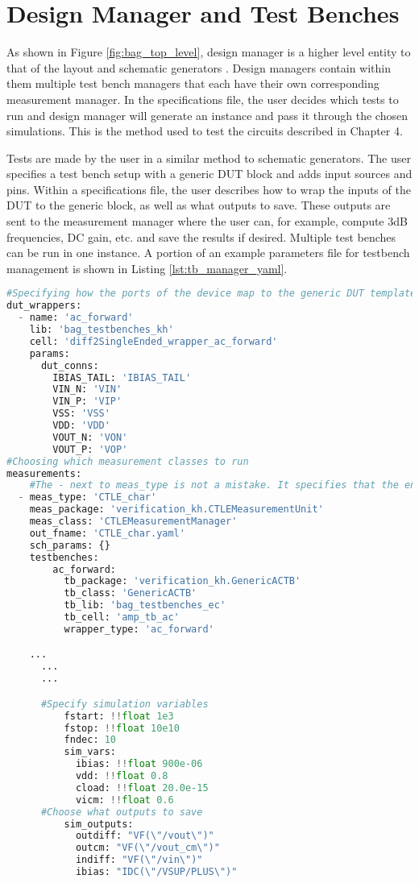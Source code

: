 \section{Design Manager and Test Benches}
As shown in Figure \ref{fig:bag_top_level}, design manager is a higher level entity to that of the layout and schematic generators \cite{chang_bag2:_2018}. Design managers contain within them multiple test bench managers that each have their own corresponding measurement manager. In the specifications file, the user decides which tests to run and design manager will generate an instance and pass it through the chosen simulations. This is the method used to test the circuits described in Chapter 4. 

Tests are made by the user in a similar method to schematic generators. The user specifies a test bench setup with a generic DUT block and adds input sources and pins. Within a specifications file, the user describes how to wrap the inputs of the DUT to the generic block, as well as what outputs to save. These outputs are sent to the measurement manager where the user can, for example, compute 3dB frequencies, DC gain, etc. and save the results if desired. Multiple test benches can be run in one instance. A portion of an example parameters file for testbench management is shown in Listing \ref{lst:tb_manager_yaml}.
\begin{lstlisting}[language=Python, caption=Test bench parameters, label={lst:tb_manager_yaml}, float]
#Specifying how the ports of the device map to the generic DUT template
dut_wrappers:
  - name: 'ac_forward'
    lib: 'bag_testbenches_kh'
    cell: 'diff2SingleEnded_wrapper_ac_forward'
    params:
      dut_conns:
        IBIAS_TAIL: 'IBIAS_TAIL'
        VIN_N: 'VIN'
        VIN_P: 'VIP'
        VSS: 'VSS'
        VDD: 'VDD'
        VOUT_N: 'VON'
        VOUT_P: 'VOP'
#Choosing which measurement classes to run
measurements:
    #The - next to meas_type is not a mistake. It specifies that the entire contents of measurements is a list.
  - meas_type: 'CTLE_char'
    meas_package: 'verification_kh.CTLEMeasurementUnit'
    meas_class: 'CTLEMeasurementManager'
    out_fname: 'CTLE_char.yaml'
    sch_params: {}
    testbenches:
        ac_forward:
          tb_package: 'verification_kh.GenericACTB'
          tb_class: 'GenericACTB'
          tb_lib: 'bag_testbenches_ec'
          tb_cell: 'amp_tb_ac'
          wrapper_type: 'ac_forward'

    ...
	  ...
	  ...

	  #Specify simulation variables
          fstart: !!float 1e3
          fstop: !!float 10e10
          fndec: 10
          sim_vars:
            ibias: !!float 900e-06
            vdd: !!float 0.8
            cload: !!float 20.0e-15
            vicm: !!float 0.6
	  #Choose what outputs to save
          sim_outputs:
            outdiff: "VF(\"/vout\")"
            outcm: "VF(\"/vout_cm\")"
            indiff: "VF(\"/vin\")"
            ibias: "IDC(\"/VSUP/PLUS\")"
\end{lstlisting}

